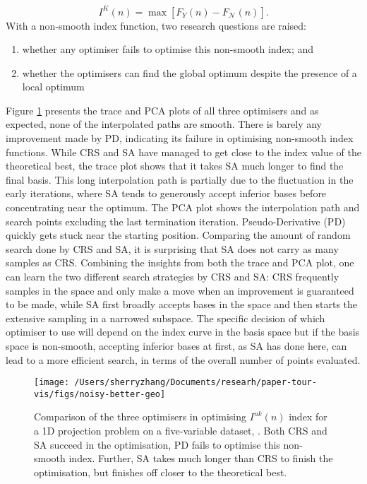 \[I^{K}(n) = \max \left[F_{Y}(n) - F_{\mathcal{N}}(n)\right].\] With a
non-smooth index function, two research questions are raised:

\begin{enumerate}
\def\labelenumi{\arabic{enumi})}
\tightlist
\item
  whether any optimiser fails to optimise this non-smooth index; and
\item
  whether the optimisers can find the global optimum despite the
  presence of a local optimum
\end{enumerate}

Figure \ref{fig:noisy-better-geo} presents the trace and PCA plots of
all three optimisers and as expected, none of the interpolated paths are
smooth. There is barely any improvement made by PD, indicating its
failure in optimising non-smooth index functions. While CRS and SA have
managed to get close to the index value of the theoretical best, the
trace plot shows that it takes SA much longer to find the final basis.
This long interpolation path is partially due to the fluctuation in the
early iterations, where SA tends to generously accept inferior bases
before concentrating near the optimum. The PCA plot shows the
interpolation path and search points excluding the last termination
iteration. Pseudo-Derivative (PD) quickly gets stuck near the starting
position. Comparing the amount of random search done by CRS and SA, it
is surprising that SA does not carry as many samples as CRS. Combining
the insights from both the trace and PCA plot, one can learn the two
different search strategies by CRS and SA: CRS frequently samples in the
space and only make a move when an improvement is guaranteed to be made,
while SA first broadly accepts bases in the space and then starts the
extensive sampling in a narrowed subspace. The specific decision of
which optimiser to use will depend on the index curve in the basis space
but if the basis space is non-smooth, accepting inferior bases at first,
as SA has done here, can lead to a more efficient search, in terms of
the overall number of points evaluated.

\begin{Schunk}
\begin{figure}

{\centering \texttt{[image: /Users/sherryzhang/Documents/researh/paper-tour-vis/figs/noisy-better-geo]} 

}

\caption[Comparison of the three optimisers in optimising $I^{nk}(n)$ index for a 1D projection problem on a five-variable dataset, ]{Comparison of the three optimisers in optimising $I^{nk}(n)$ index for a 1D projection problem on a five-variable dataset, . Both CRS and SA succeed in the optimisation, PD fails to optimise this non-smooth index. Further, SA takes  much longer than CRS to finish the optimisation, but finishes off closer to the theoretical best.}\label{fig:noisy-better-geo}
\end{figure}
\end{Schunk}

